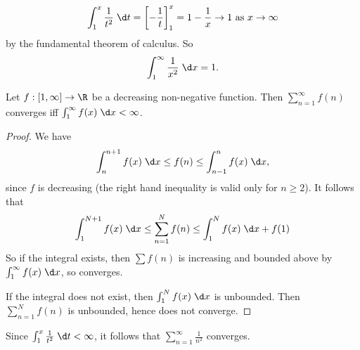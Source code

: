 \documentclass[a4paper]{article}
\begin{document}
\begin{eg}
  \[
    \int_1^x \frac{1}{t^2}\;\d t = \left[-\frac{1}{t}\right]_1^x = 1 - \frac{1}{x} \to 1\text{ as }x\to \infty
  \]
  by the fundamental theorem of calculus. So
  \[
    \int_1^{\infty}\frac{1}{x^2}\;\d x = 1.
  \]
\end{eg}

\begin{thm}
  Let $f: [1, \infty] \to \R$ be a decreasing non-negative function. Then $\sum_{n = 1}^\infty f(n)$ converges iff $\int_1^\infty f(x)\;\d x < \infty$.
\end{thm}

\begin{proof}
  We have
  \[
    \int_n^{n + 1}f(x)\;\d x \leq f(n) \leq \int_{n -1}^n f(x)\;\d x,
  \]
  since $f$ is decreasing (the right hand inequality is valid only for $n\geq 2$). It follows that
  \[
    \int_1^{N + 1}f(x)\;\d x \leq \sum_{n = 1}^N f(n) \leq \int_1^N f(x)\;\d x + f(1)
  \]
  So if the integral exists, then $\sum f(n)$ is increasing and bounded above by $\int_1^\infty f(x)\;\d x$, so converges.

  If the integral does not exist, then $\int_1^N f(x)\;\d x$ is unbounded. Then $\sum_{n = 1}^N f(n)$ is unbounded, hence does not converge.
\end{proof}

\begin{eg}
  Since $\int_1^x \frac{1}{t^2}\;\d t < \infty$, it follows that $\sum_{n = 1}^\infty \frac{1}{n^2}$ converges.
\end{eg}
\end{document}
